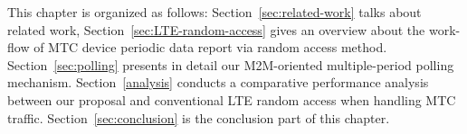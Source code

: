 This chapter is organized as follows: Section~\ref{sec:related-work} talks about related work, Section~\ref{sec:LTE-random-access} gives an overview about the work-flow of MTC device periodic data report via random access method. Section~\ref{sec:polling} presents in detail our M2M-oriented multiple-period polling mechanism. Section~\ref{analysis} conducts a comparative performance analysis between our proposal and conventional LTE random access when handling MTC traffic. Section~\ref{sec:conclusion} is the conclusion part of this chapter.

